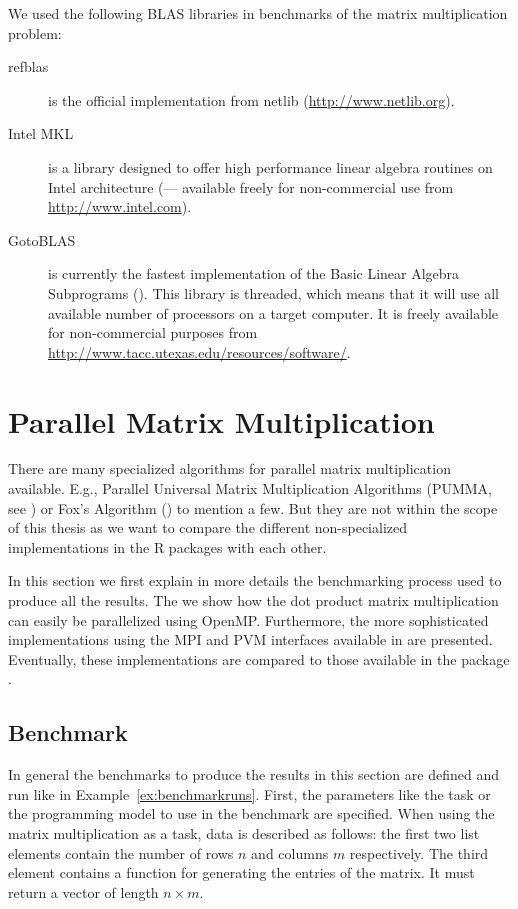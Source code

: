 We used the following BLAS libraries in benchmarks of  the matrix
multiplication problem:

\begin{description}
\item[refblas] is the official implementation from netlib
  (\url{http://www.netlib.org}).
\item[Intel MKL] is a library designed to offer high performance
  linear algebra routines on
 Intel architecture (\cite{intel07MKL}--- available
  freely for non-commercial use from \url{http://www.intel.com}). 
\item[GotoBLAS] is currently the fastest implementation of the Basic
  Linear Algebra Subprograms (\cite{goto07gotoblas}). This library is
  threaded, which means that it will use all available number of
  processors on a target computer. It is freely available for
  non-commercial purposes from
  \url{http://www.tacc.utexas.edu/resources/software/}.
\end{description}



\section{Parallel Matrix Multiplication}
\label{sec:parmm}

There are many specialized algorithms for parallel matrix multiplication
available. E.g., Parallel Universal Matrix Multiplication Algorithms
(PUMMA, see \cite{choi93pumma}) or Fox's Algorithm (\cite{fox87mah}) to
mention a few. But they are not within the scope of this thesis
as we want to compare the different non-specialized implementations in the
R packages with each other.

In this section we first explain in more details the benchmarking process
used to produce all the results. The we show how the dot product
matrix multiplication can 
easily be parallelized using OpenMP. Furthermore, the more
sophisticated implementations using the MPI and PVM interfaces
available in  are
presented. Eventually, these implementations are compared to those
available in the package .   

\subsection{Benchmark}
\label{sec:benchmarkdescription}

In general the benchmarks to produce the results in this
section are defined and run like in
Example~\ref{ex:benchmarkruns}. First, the parameters like the task or
the programming model to use in the benchmark are specified. When using
the matrix multiplication as a task, data is described as follows: the
first two list elements contain the number of rows $n$ and columns $m$
respectively. The
third element contains a function for generating the entries of the
matrix. It must return a vector of length $n \times m$.

